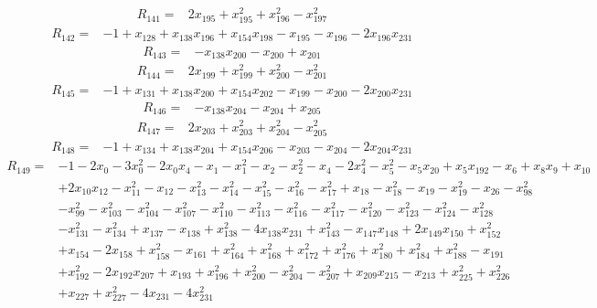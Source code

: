 \begin{align*}
 R_{141}={}&2x_{195} +x_{195}^{2} +x_{196}^{2} -x_{197}^{2}
\end{align*}
\begin{align*}
 R_{142}={}&-1 +x_{128} +x_{138}x_{196} +x_{154}x_{198} -x_{195} -x_{196} -2x_{196}x_{231}
\end{align*}
\begin{align*}
 R_{143}={}&-x_{138}x_{200} -x_{200} +x_{201}
\end{align*}
\begin{align*}
 R_{144}={}&2x_{199} +x_{199}^{2} +x_{200}^{2} -x_{201}^{2}
\end{align*}
\begin{align*}
 R_{145}={}&-1 +x_{131} +x_{138}x_{200} +x_{154}x_{202} -x_{199} -x_{200} -2x_{200}x_{231}
\end{align*}
\begin{align*}
 R_{146}={}&-x_{138}x_{204} -x_{204} +x_{205}
\end{align*}
\begin{align*}
 R_{147}={}&2x_{203} +x_{203}^{2} +x_{204}^{2} -x_{205}^{2}
\end{align*}
\begin{align*}
 R_{148}={}&-1 +x_{134} +x_{138}x_{204} +x_{154}x_{206} -x_{203} -x_{204} -2x_{204}x_{231}
\end{align*}
\begin{align*}
 R_{149}={}&-1 -2x_{0} -3x_{0}^{2} -2x_{0}x_{4} -x_{1} -x_{1}^{2} -x_{2} -x_{2}^{2} -x_{4} -2x_{4}^{2} -x_{5}^{2} -x_{5}x_{20} +x_{5}x_{192} -x_{6} +x_{8}x_{9} +x_{10}\\
 &+2x_{10}x_{12} -x_{11}^{2} -x_{12} -x_{13}^{2} -x_{14}^{2} -x_{15}^{2} -x_{16}^{2} -x_{17}^{2} +x_{18} -x_{18}^{2} -x_{19} -x_{19}^{2} -x_{26} -x_{98}^{2}\\
 &-x_{99}^{2} -x_{103}^{2} -x_{104}^{2} -x_{107}^{2} -x_{110}^{2} -x_{113}^{2} -x_{116}^{2} -x_{117}^{2} -x_{120}^{2} -x_{123}^{2} -x_{124}^{2} -x_{128}^{2}\\
 &-x_{131}^{2} -x_{134}^{2} +x_{137} -x_{138} +x_{138}^{2} -4x_{138}x_{231} +x_{143}^{2} -x_{147}x_{148} +2x_{149}x_{150} +x_{152}^{2}\\
 &+x_{154} -2x_{158} +x_{158}^{2} -x_{161} +x_{164}^{2} +x_{168}^{2} +x_{172}^{2} +x_{176}^{2} +x_{180}^{2} +x_{184}^{2} +x_{188}^{2} -x_{191}\\
 &+x_{192}^{2} -2x_{192}x_{207} +x_{193} +x_{196}^{2} +x_{200}^{2} -x_{204}^{2} -x_{207}^{2} +x_{209}x_{215} -x_{213} +x_{225}^{2} +x_{226}^{2}\\
 &+x_{227} +x_{227}^{2} -4x_{231} -4x_{231}^{2}
\end{align*}

